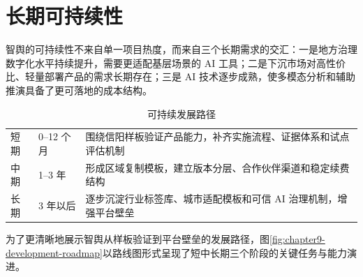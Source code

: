 \section{长期可持续性}

智舆的可持续性不来自单一项目热度，而来自三个长期需求的交汇：一是地方治理数字化水平持续提升，需要更适配基层场景的 AI 工具；二是下沉市场对高性价比、轻量部署产品的需求长期存在；三是 AI 技术逐步成熟，使多模态分析和辅助推演具备了更可落地的成本结构。

\begin{table}[htbp]
	\centering
	\caption{可持续发展路径}
	\begin{tabularx}{\textwidth}{L{2.4cm}L{2.3cm}Y}
		\toprule
		 &  &                      \\
		\midrule
		短期           & 0--12 个月       & 围绕信阳样板验证产品能力，补齐实施流程、证据体系和试点评估机制    \\
		中期           & 1--3 年         & 形成区域复制模板，建立版本分层、合作伙伴渠道和稳定续费结构      \\
		长期           & 3 年以后          & 逐步沉淀行业标签库、城市适配模板和可信 AI 治理机制，增强平台壁垒 \\
		\bottomrule
	\end{tabularx}
\end{table}

为了更清晰地展示智舆从样板验证到平台壁垒的发展路径，图\ref{fig:chapter9-development-roadmap}以路线图形式呈现了短中长期三个阶段的关键任务与能力演进。

